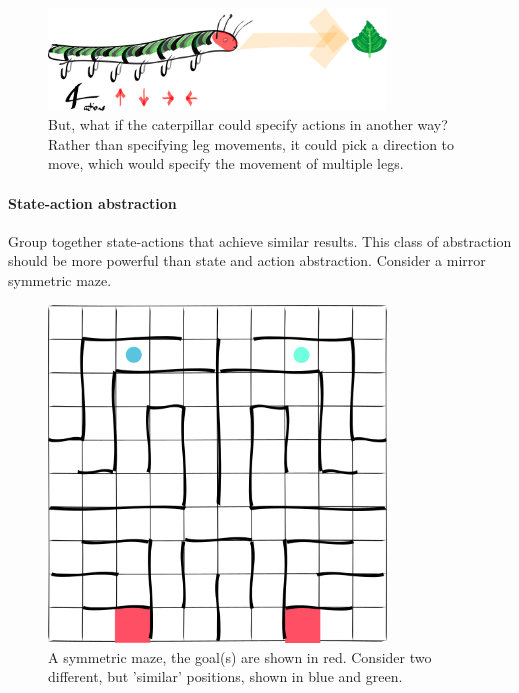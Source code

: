 \begin{figure}[h!]
\centering
\includegraphics[width=0.8\textwidth,height=0.2\textheight]{../../pictures/drawings/full-caterpillar.png}
\caption{But, what if the caterpillar could specify actions in another way?
Rather than specifying leg movements, it could pick a direction to move,
which would specify the movement of multiple legs.}
\end{figure}

\paragraph{State-action abstraction}

Group together state-actions that achieve similar results. This class of abstraction
should be more powerful than state and action abstraction. Consider a mirror symmetric maze.

\begin{figure}[h!]
\centering
\includegraphics[width=0.8\textwidth,height=0.4\textheight]{../../pictures/drawings/maze.png}
\caption{A symmetric maze, the goal(s) are shown in red.
Consider two different, but 'similar' positions, shown in blue and green.}
\end{figure}

